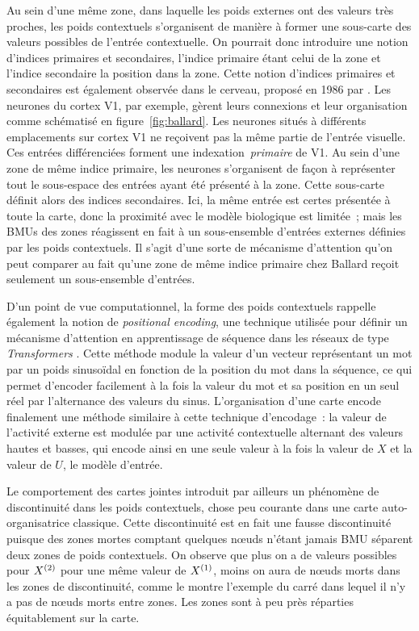 \documentclass[../main]{subfiles}
\begin{document}
Au sein d'une même zone, dans laquelle les poids externes ont des valeurs très proches, les poids contextuels s'organisent de manière à former une sous-carte des valeurs possibles de l'entrée contextuelle.
On pourrait donc introduire une notion d'indices primaires et secondaires, l'indice primaire étant celui de la zone et l'indice secondaire la position dans la zone.
Cette notion d'indices primaires et secondaires est également observée dans le cerveau, proposé en 1986 par \cite{ballard_cortical_1986}. Les neurones du cortex V1, par exemple, gèrent leurs connexions et leur organisation comme schématisé en figure~\ref{fig:ballard}.
Les neurones situés à différents emplacements sur cortex V1 ne reçoivent pas la même partie de l'entrée visuelle. Ces entrées différenciées forment une indexation~\emph{primaire} de V1. Au sein d'une zone de même indice primaire, les neurones s'organisent de façon à représenter tout le sous-espace des entrées ayant été présenté à la zone. Cette sous-carte définit alors des indices secondaires.
Ici, la même entrée est certes présentée à toute la carte, donc la proximité avec le modèle biologique est limitée~; mais les BMUs des zones réagissent en fait à un sous-ensemble d'entrées externes définies par les poids contextuels. Il s'agit d'une sorte de mécanisme d'attention qu'on peut comparer au fait qu'une zone de même indice primaire chez Ballard reçoit seulement un sous-ensemble d'entrées.

D'un point de vue computationnel, la forme des poids contextuels rappelle également la notion de \emph{positional encoding}, une technique utilisée pour définir un mécanisme d'attention en apprentissage de séquence dans les réseaux de type \emph{Transformers} \cite{vaswani_attention_2017}.
Cette méthode module la valeur d'un vecteur représentant un mot par un poids sinusoïdal en fonction de la position du mot dans la séquence, ce qui permet d'encoder facilement à la fois la valeur du mot et sa position en un seul réel par l'alternance des valeurs du sinus.
L'organisation d'une carte encode finalement une méthode similaire à cette technique d'encodage~: la valeur de l'activité externe est modulée par une activité contextuelle alternant des valeurs hautes et basses, qui encode ainsi en une seule valeur à la fois la valeur de $X$ et la valeur de $U$, le modèle d'entrée.


Le comportement des cartes jointes introduit par ailleurs un phénomène de discontinuité dans les poids contextuels, chose peu courante dans une carte auto-organisatrice classique.
Cette discontinuité est en fait une fausse discontinuité puisque des zones mortes comptant quelques n\oe{}uds n'étant jamais BMU séparent deux zones de poids contextuels.
On observe que plus on a de valeurs possibles pour $X^{({2})}$ pour une même valeur de $X^{({1})}$, moins on aura de n\oe{}uds morts dans les zones de discontinuité, comme le montre l'exemple du carré dans lequel il n'y a pas de n\oe{}uds morts entre zones.
Les zones sont à peu près réparties équitablement sur la carte. 
\end{document}
